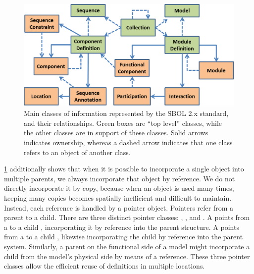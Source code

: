 \begin{figure}[ht]
\begin{center}
\includegraphics[scale=0.85]{images/OverviewFig2-v4.png}
\caption{Main classes of information represented by the SBOL 2.x standard, and their relationships.  Green boxes are ``top level'' classes, while the other classes are in support of these classes. Solid arrows indicates ownership, whereas a dashed arrow indicates that one class refers to an object of another class.}
\label{images:overview2}
\end{center}
\end{figure}

\ref{images:overview2} additionally shows that when it is possible to incorporate a single object into multiple parents, we always incorporate that object by reference. We do not directly incorporate it by copy, because when an object is used many times, keeping many copies becomes spatially inefficient and difficult to maintain.
Instead, each reference is handled by a pointer object. 
Pointers refer from a parent to a child. There are three distinct pointer classes: , , and . A  points from a  to a child , incorporating it by reference into the parent structure. A  points from a  to a child , likewise incorporating the child by reference into the parent system. Similarly, a parent  on the functional side of a model might incorporate a child  from the model's physical side by means of a  reference. These three pointer classes allow the efficient reuse of definitions in multiple locations.

